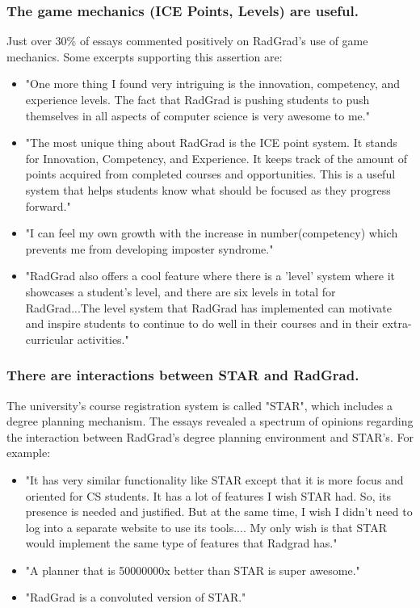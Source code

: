 \documentclass[acmsmall]{acmart}
\begin{document}
\subsubsection{The game mechanics (ICE Points, Levels) are useful.} Just over 30\% of essays commented positively on RadGrad's use of game mechanics.  Some excerpts supporting this assertion are:
\begin{itemize}[leftmargin=*]
\item "One more thing I found very intriguing is the innovation, competency, and experience levels. The fact that RadGrad is pushing students to push themselves in all aspects of computer science is very awesome to me."
\item "The most unique thing about RadGrad is the ICE point system. It stands for Innovation, Competency, and Experience. It keeps track of the amount of points acquired from completed courses and opportunities. This is a useful system that helps students know what should be focused as they progress forward."
\item "I can feel my own growth with the increase in number(competency) which prevents me from developing imposter syndrome."
\item "RadGrad also offers a cool feature where there is a 'level' system where it showcases a student's level, and there are six levels in total for RadGrad...The level system that RadGrad has implemented can motivate and inspire students to continue to do well in their courses and in their extra-curricular activities."
\end{itemize}

\subsubsection{There are interactions between STAR and RadGrad.} The university's course registration system is called "STAR", which includes a degree planning mechanism. The essays revealed a spectrum of opinions regarding the interaction between RadGrad's degree planning environment and STAR's.  For example:
\begin{itemize}[leftmargin=*]
\item "It has very similar functionality like STAR except that it is more focus and oriented for CS students. It has a lot of features I wish STAR had. So, its presence is needed and justified. But at the same time, I wish I didn’t need to log into a separate website to use its tools.... My only wish is that STAR would implement the same type of features that Radgrad has."
\item "A planner that is 50000000x better than STAR is super awesome."
\item "RadGrad is a convoluted version of STAR."
\end{itemize}
\end{document}

